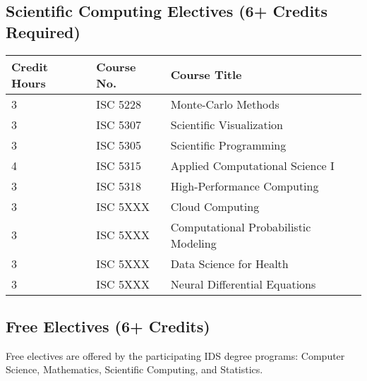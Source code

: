\documentclass[12pt,a4paper]{article}
\begin{document}
\subsection*{Scientific Computing Electives (6+ Credits Required)}
\begin{tabular}{l l l}
\hline
\textbf{Credit Hours} & \textbf{Course No.} & \textbf{Course Title} \\ \hline
3 & ISC 5228 & Monte-Carlo Methods \\
3 & ISC 5307 & Scientific Visualization \\
3 & ISC 5305 & Scientific Programming \\
4 & ISC 5315 & Applied Computational Science I \\
3 & ISC 5318 & High-Performance Computing \\
3 & ISC 5XXX & Cloud Computing \\
3 & ISC 5XXX & Computational Probabilistic Modeling \\
3 & ISC 5XXX & Data Science for Health \\
3 & ISC 5XXX & Neural Differential Equations \\ \hline
\end{tabular}

\subsection*{Free Electives (6+ Credits)}
Free electives are offered by the participating IDS degree programs: Computer Science, Mathematics, Scientific Computing, and Statistics.
\end{document}
